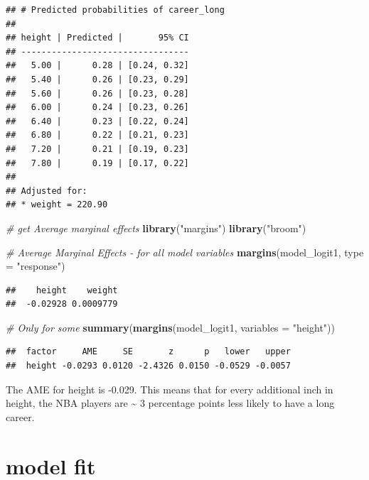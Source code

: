 \documentclass[
]{book}
\newenvironment{Shaded}{\begin{snugshade}}{\end{snugshade}}
\newcommand{\AttributeTok}[1]{\textcolor[rgb]{0.13,0.29,0.53}{#1}}
\newcommand{\CommentTok}[1]{\textcolor[rgb]{0.56,0.35,0.01}{\textit{#1}}}
\newcommand{\FunctionTok}[1]{\textcolor[rgb]{0.13,0.29,0.53}{\textbf{#1}}}
\newcommand{\NormalTok}[1]{#1}
\newcommand{\StringTok}[1]{\textcolor[rgb]{0.31,0.60,0.02}{#1}}
\begin{document}
\begin{verbatim}
## # Predicted probabilities of career_long
## 
## height | Predicted |       95% CI
## ---------------------------------
##   5.00 |      0.28 | [0.24, 0.32]
##   5.40 |      0.26 | [0.23, 0.29]
##   5.60 |      0.26 | [0.23, 0.28]
##   6.00 |      0.24 | [0.23, 0.26]
##   6.40 |      0.23 | [0.22, 0.24]
##   6.80 |      0.22 | [0.21, 0.23]
##   7.20 |      0.21 | [0.19, 0.23]
##   7.80 |      0.19 | [0.17, 0.22]
## 
## Adjusted for:
## * weight = 220.90
\end{verbatim}

\begin{Shaded}
\begin{Highlighting}[]
\CommentTok{\# get Average marginal effects}
\FunctionTok{library}\NormalTok{(}\StringTok{"margins"}\NormalTok{)}
\FunctionTok{library}\NormalTok{(}\StringTok{"broom"}\NormalTok{)}

\CommentTok{\# Average Marginal Effects {-} for all model variables}
\FunctionTok{margins}\NormalTok{(model\_logit1, }\AttributeTok{type =} \StringTok{"response"}\NormalTok{)}
\end{Highlighting}
\end{Shaded}

\begin{verbatim}
##    height    weight
##  -0.02928 0.0009779
\end{verbatim}

\begin{Shaded}
\begin{Highlighting}[]
\CommentTok{\# Only for some}
\FunctionTok{summary}\NormalTok{(}\FunctionTok{margins}\NormalTok{(model\_logit1, }\AttributeTok{variables =} \StringTok{"height"}\NormalTok{))}
\end{Highlighting}
\end{Shaded}

\begin{verbatim}
##  factor     AME     SE       z      p   lower   upper
##  height -0.0293 0.0120 -2.4326 0.0150 -0.0529 -0.0057
\end{verbatim}

The AME for height is -0.029. This means that for every additional inch in height,
the NBA players are \textasciitilde{} 3 percentage points less likely to have a long career.

\hypertarget{model-fit-1}{%
\section{model fit}\label{model-fit-1}}
\end{document}
